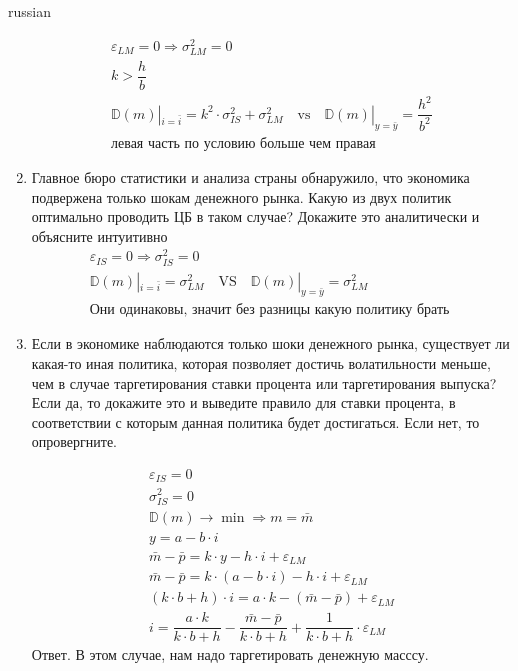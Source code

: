 \documentclass{article}
\begin{document}
\begin{otherlanguage*}{russian}
\begin{enumerate}
\begin{align*}
\varepsilon_{LM} = 0 \Rightarrow \sigma^2_{LM} = 0 \\
k > \dfrac{h}{b} \\
\mathbb{D} (m)|_{i = \bar{i}} = k^2 \cdot \sigma^2_{IS} + \sigma^2_{LM} \quad \text{vs} \quad  \mathbb{D} (m) |_{y = \bar{y}} = \dfrac{h^2}{b^2} \\
\text{левая часть по условию больше чем правая}
\end{align*}

\item Главное бюро статистики и анализа страны обнаружило, что экономика подвержена только
шокам денежного рынка. Какую из двух политик оптимально проводить ЦБ в таком случае?
Докажите это аналитически и объясните интуитивно
\begin{align*}
\varepsilon_{IS} = 0 \Rightarrow \sigma^2_{IS} = 0 \\
\mathbb{D} (m)|_{i = \bar{i}}  = \sigma^2_{LM} \quad \text{VS} \quad \mathbb{D} (m) |_{y = \bar{y}} = \sigma^2_{LM} \\
\text{Они одинаковы, значит без разницы какую политику брать } 
\end{align*}

\item Если в экономике наблюдаются только шоки денежного рынка, существует ли какая-то иная
политика, которая позволяет достичь волатильности меньше, чем в случае таргетирования
ставки процента или таргетирования выпуска? Если да, то докажите это и выведите правило для
ставки процента, в соответствии с которым данная политика будет достигаться. Если нет, то
опровергните.

\begin{align*}
\varepsilon_{IS} = 0 \\
\sigma^2_{IS} = 0 \\
\mathbb{D} (m) \rightarrow \min \Rightarrow m = \bar{m} \\
y = a - b \cdot i \\
\bar{m} - \bar{p} = k \cdot y - h \cdot i + \varepsilon_{LM} \\
\bar{m} - \bar{p} = k \cdot (a - b \cdot i) - h \cdot i + \varepsilon_{LM} \\
(k \cdot b + h ) \cdot i = a \cdot k - ( \bar{m} - \bar{p} ) + \varepsilon_{LM} \\
i = \dfrac{a \cdot k}{k \cdot b + h}  - \dfrac{\bar{m} - \bar{p}}{k \cdot b + h } + \dfrac{1}{k \cdot b + h } \cdot \varepsilon_{LM} 
\end{align*}
Ответ. В этом случае, нам надо таргетировать денежную масссу. 
\begin{align*}
\end{align*}
\end{enumerate}
\end{otherlanguage*} 
\end{document}
